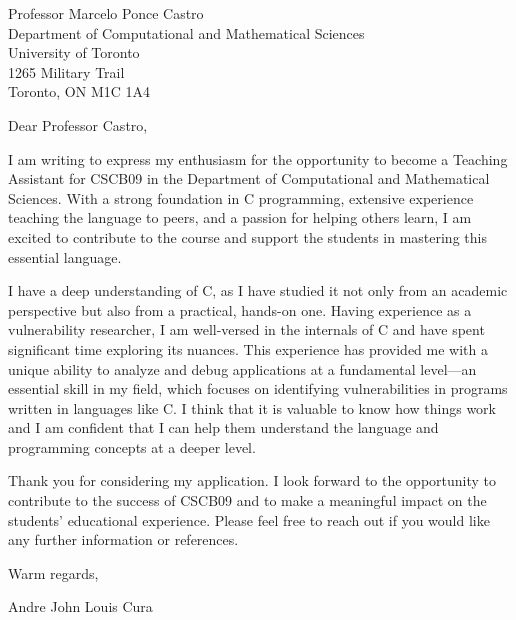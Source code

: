 \documentclass[a4paper,12pt]{letter}
\date{\today}
\begin{document}
\begin{letter}{Professor Marcelo Ponce Castro \\
Department of Computational and Mathematical Sciences \\
University of Toronto \\
1265 Military Trail \\
Toronto, ON M1C 1A4}

\opening{Dear Professor Castro,}

I am writing to express my enthusiasm for the opportunity to become a Teaching Assistant for CSCB09 in the Department of Computational and Mathematical Sciences. With a strong foundation in C programming, extensive experience teaching the language to peers, and a passion for helping others learn, I am excited to contribute to the course and support the students in mastering this essential language.

I have a deep understanding of C, as I have studied it not only from an academic perspective but also from a practical, hands-on one. Having experience as a vulnerability researcher, I am well-versed in the internals of C and have spent significant time exploring its nuances. This experience has provided me with a unique ability to analyze and debug applications at a fundamental level—an essential skill in my field, which focuses on identifying vulnerabilities in programs written in languages like C. I think that it is valuable to know how things work and I am confident that I can help them understand the language and programming concepts at a deeper level.

Thank you for considering my application. I look forward to the opportunity to contribute to the success of CSCB09 and to make a meaningful impact on the students' educational experience. Please feel free to reach out if you would like any further information or references.

\closing{Warm regards,}
Andre John Louis Cura

\end{letter}
\end{document}
